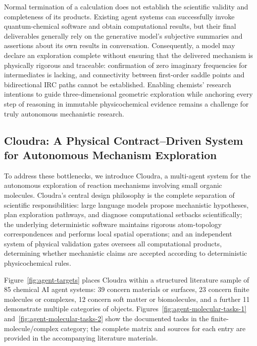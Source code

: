 Normal termination of a calculation does not establish the scientific validity and completeness of its products. Existing agent systems can successfully invoke quantum-chemical software and obtain computational results, but their final deliverables generally rely on the generative model's subjective summaries and assertions about its own results in conversation. Consequently, a model may declare an exploration complete without ensuring that the delivered mechanism is physically rigorous and traceable: confirmation of zero imaginary frequencies for intermediates is lacking, and connectivity between first-order saddle points and bidirectional IRC paths cannot be established. Enabling chemists' research intentions to guide three-dimensional geometric exploration while anchoring every step of reasoning in immutable physicochemical evidence remains a challenge for truly autonomous mechanistic research.

\subsection{Cloudra: A Physical Contract–Driven System for Autonomous Mechanism Exploration}

To address these bottlenecks, we introduce Cloudra, a multi-agent system for the autonomous exploration of reaction mechanisms involving small organic molecules. Cloudra's central design philosophy is the complete separation of scientific responsibilities: large language models propose mechanistic hypotheses, plan exploration pathways, and diagnose computational setbacks scientifically; the underlying deterministic software maintains rigorous atom-topology correspondences and performs local spatial operations; and an independent system of physical validation gates oversees all computational products, determining whether mechanistic claims are accepted according to deterministic physicochemical rules.

Figure~\ref{fig:agent-targets} places Cloudra within a structured literature sample of 85 chemical AI agent systems: 39 concern materials or surfaces, 23 concern finite molecules or complexes, 12 concern soft matter or biomolecules, and a further 11 demonstrate multiple categories of objects. Figures~\ref{fig:agent-molecular-tasks-1} and~\ref{fig:agent-molecular-tasks-2} show the documented tasks in the finite-molecule/complex category; the complete matrix and sources for each entry are provided in the accompanying literature materials.



